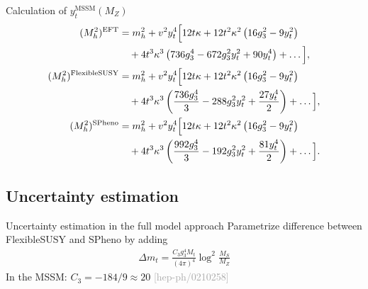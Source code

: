 \documentclass[hyperref={pdfpagelabels=false},ngerman]{beamer}
\newcommand{\bigcite}[1]{\textcolor{darkgray}{[#1]}}
\begin{document}
\begin{frame}{Calculation of $y_t^{\text{MSSM}}(M_Z)$}
  \begin{align*}
    (M_h^2)^{\text{EFT}}&=
    m_h^2
    + v^2 
    y_t^4\Big[12 t \kappa
    +12 t^2 \kappa^2 
    \left(16 {g}_3^2 - 9y_t^2 \right)
    \\&\quad{}
    +
    4 t^3\kappa^3  \left(736 {g}_3^4-672 {g}_3^2 y_t^2+90
      y_t^4\right) 
    +\ldots\Big],
    \\
    (M_h^2)^{\text{FlexibleSUSY}}&=
    m_h^2
    + v^2 
    y_t^4\Big[12 t \kappa
    +12 t^2 \kappa^2 
    \left(16 {g}_3^2 - 9y_t^2 \right)
    \\&\quad{}
    +4 t^3\kappa^3 \left(\frac{736 {g}_3^4}{3}-288 {g}_3^2
      y_t^2+\frac{27 y_t^4}{2}\right)
    +\ldots\Big],
    \\
    (M_h^2)^{\text{SPheno}}&=
    m_h^2
    + v^2 
    y_t^4\Big[12 t \kappa
    +12 t^2 \kappa^2 
    \left(16 {g}_3^2 - 9y_t^2 \right)
    \\&\quad{}
    +4 t^3\kappa^3 \left(\frac{992 {g}_3^4}{3}-192 {g}_3^2
      y_t^2+\frac{81 y_t^4}{2}\right)
    +\ldots\Big].
  \end{align*}
\end{frame}



\subsection{Uncertainty estimation}

\begin{frame}{Uncertainty estimation in the full model approach}
  Parametrize difference between FlexibleSUSY and SPheno by adding
  \begin{align*}
    \Delta m_t = \frac{C_3 g_3^4 M_t}{(4\pi)^4} \log^2\frac{M_S}{M_Z}
  \end{align*}
  In the MSSM: $C_3 = -184/9 \approx 20$ \bigcite{hep-ph/0210258}
\end{frame}
\end{document}
